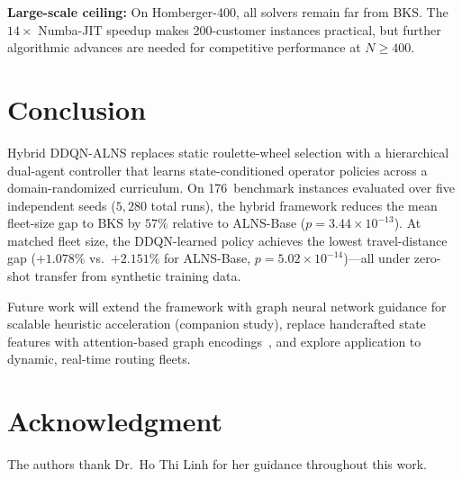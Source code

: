 \documentclass[journal]{IEEEtran}
\begin{document}
\textbf{Large-scale ceiling:}  On Homberger-400, all solvers remain far from BKS.
The $14{\times}$ Numba-JIT speedup makes 200-customer instances practical, but
further algorithmic advances are needed for competitive performance
at $N{\ge}400$.


\section{Conclusion}
\label{sec:conclusion}

Hybrid DDQN-ALNS replaces static roulette-wheel selection with a hierarchical
dual-agent controller that learns state-conditioned operator policies across a
domain-randomized curriculum.  On 176~benchmark instances evaluated over
five independent seeds ($5{,}280$ total runs), the hybrid framework reduces the
mean fleet-size gap to BKS by $57\%$ relative to ALNS-Base
($p{=}3.44{\times}10^{-13}$).  At matched fleet size, the DDQN-learned policy
achieves the lowest travel-distance gap ($+1.078\%$ vs.\ $+2.151\%$ for
ALNS-Base, $p{=}5.02{\times}10^{-14}$)---all under zero-shot transfer
from synthetic training data.

Future work will extend the framework with graph neural network
guidance for scalable heuristic acceleration (companion study), replace
handcrafted state features with attention-based graph
encodings~\cite{kool2019attention,vinyals2015pointer}, and explore
application to dynamic, real-time routing fleets.


\section*{Acknowledgment}
The authors thank Dr.~Ho Thi Linh for her guidance throughout this work.

\balance
\end{document}
